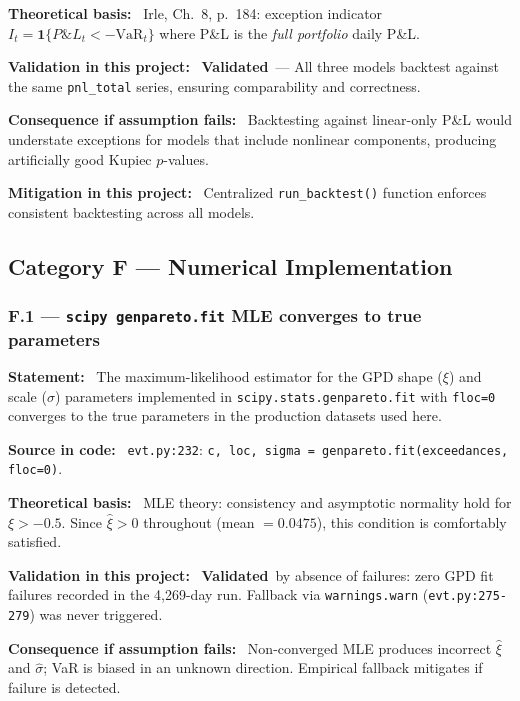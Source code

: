 \documentclass[11pt,a4paper]{article}
\newcommand{\asmfield}[1]{\medskip\noindent\textbf{#1:}\ }
\newcommand{\code}[1]{\texttt{#1}}
\newcommand{\validated}{\textbf{Validated}}
\begin{document}
\asmfield{Theoretical basis}
Irle, Ch.~8, p.~184: exception indicator $I_t = \mathbf{1}\{P\&L_t <
-\text{VaR}_t\}$ where P\&L is the \emph{full portfolio} daily P\&L.

\asmfield{Validation in this project}
\validated\ --- All three models backtest against the same \code{pnl\_total}
series, ensuring comparability and correctness.

\asmfield{Consequence if assumption fails}
Backtesting against linear-only P\&L would understate exceptions for models
that include nonlinear components, producing artificially good Kupiec
$p$-values.

\asmfield{Mitigation in this project}
Centralized \code{run\_backtest()} function enforces consistent backtesting
across all models.

\subsection{Category F --- Numerical Implementation}\label{sec:catF}

\subsubsection{F.1 --- \texttt{scipy genpareto.fit} MLE converges to true parameters}\label{asm:F1}

\asmfield{Statement}
The maximum-likelihood estimator for the GPD shape ($\xi$) and scale
($\sigma$) parameters implemented in \code{scipy.stats.genpareto.fit}
with \code{floc=0} converges to the true parameters in the production
datasets used here.

\asmfield{Source in code}
\code{evt.py:232}: \lstinline|c, loc, sigma = genpareto.fit(exceedances, floc=0)|.

\asmfield{Theoretical basis}
MLE theory: consistency and asymptotic normality hold for $\xi > -0.5$.
Since $\hat{\xi} > 0$ throughout (mean $= 0.0475$), this condition is
comfortably satisfied.

\asmfield{Validation in this project}
\validated\ by absence of failures: zero GPD fit failures recorded in the
4{,}269-day run. Fallback via \code{warnings.warn} (\code{evt.py:275-279})
was never triggered.

\asmfield{Consequence if assumption fails}
Non-converged MLE produces incorrect $\hat{\xi}$ and $\hat{\sigma}$; VaR
is biased in an unknown direction. Empirical fallback mitigates if failure
is detected.
\end{document}
